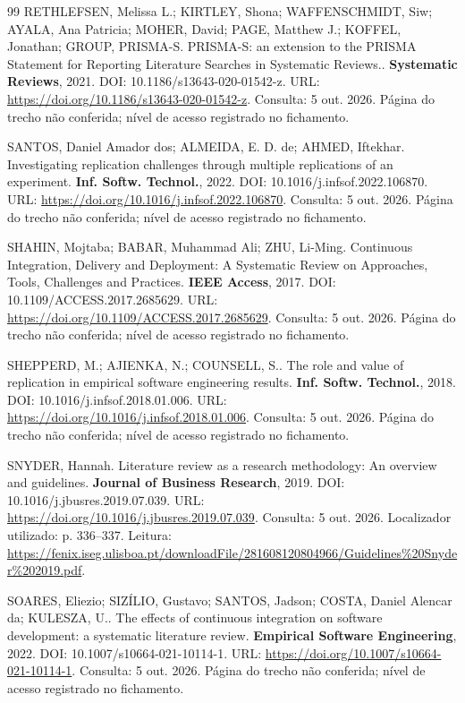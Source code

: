 \begin{thebibliography}{99}
 RETHLEFSEN, Melissa L.; KIRTLEY, Shona; WAFFENSCHMIDT, Siw; AYALA, Ana Patricia; MOHER, David; PAGE, Matthew J.; KOFFEL, Jonathan; GROUP, PRISMA-S. PRISMA-S: an extension to the PRISMA Statement for Reporting Literature Searches in Systematic Reviews.. \textbf{Systematic Reviews}, 2021. DOI: 10.1186/s13643-020-01542-z. URL: \url{https://doi.org/10.1186/s13643-020-01542-z}. Consulta: 5 out. 2026. Página do trecho não conferida; nível de acesso registrado no fichamento.


 SANTOS, Daniel Amador dos; ALMEIDA, E. D. de; AHMED, Iftekhar. Investigating replication challenges through multiple replications of an experiment. \textbf{Inf. Softw. Technol.}, 2022. DOI: 10.1016/j.infsof.2022.106870. URL: \url{https://doi.org/10.1016/j.infsof.2022.106870}. Consulta: 5 out. 2026. Página do trecho não conferida; nível de acesso registrado no fichamento.


 SHAHIN, Mojtaba; BABAR, Muhammad Ali; ZHU, Li-Ming. Continuous Integration, Delivery and Deployment: A Systematic Review on Approaches, Tools, Challenges and Practices. \textbf{IEEE Access}, 2017. DOI: 10.1109/ACCESS.2017.2685629. URL: \url{https://doi.org/10.1109/ACCESS.2017.2685629}. Consulta: 5 out. 2026. Página do trecho não conferida; nível de acesso registrado no fichamento.


 SHEPPERD, M.; AJIENKA, N.; COUNSELL, S.. The role and value of replication in empirical software engineering results. \textbf{Inf. Softw. Technol.}, 2018. DOI: 10.1016/j.infsof.2018.01.006. URL: \url{https://doi.org/10.1016/j.infsof.2018.01.006}. Consulta: 5 out. 2026. Página do trecho não conferida; nível de acesso registrado no fichamento.


 SNYDER, Hannah. Literature review as a research methodology: An overview and guidelines. \textbf{Journal of Business Research}, 2019. DOI: 10.1016/j.jbusres.2019.07.039. URL: \url{https://doi.org/10.1016/j.jbusres.2019.07.039}. Consulta: 5 out. 2026. Localizador utilizado: p. 336–337. Leitura: \url{https://fenix.iseg.ulisboa.pt/downloadFile/281608120804966/Guidelines%20Snyder%202019.pdf}.


 SOARES, Eliezio; SIZÍLIO, Gustavo; SANTOS, Jadson; COSTA, Daniel Alencar da; KULESZA, U.. The effects of continuous integration on software development: a systematic literature review. \textbf{Empirical Software Engineering}, 2022. DOI: 10.1007/s10664-021-10114-1. URL: \url{https://doi.org/10.1007/s10664-021-10114-1}. Consulta: 5 out. 2026. Página do trecho não conferida; nível de acesso registrado no fichamento.



\end{thebibliography}
